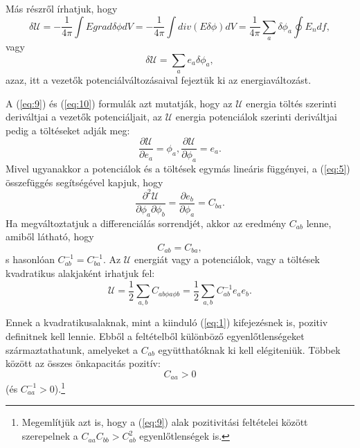 \documentclass{article}
\begin{document}
Más részről írhatjuk, hogy
\begin{equation} \label{eq:10}
    \delta \mathcal{U} = -\frac{1}{4 \pi} \int Egrad \delta \phi dV=-\frac{1}{4 \pi} \int div(E \delta \phi)dV= \frac{1}{4 \pi} \sum\limits_a \delta \phi_a \oint E_n df,
\end{equation}
vagy
\begin{equation} \label{eq:11}
    \delta \mathcal{U} = \sum\limits_a e_a \delta \phi_a ,
\end{equation}
azaz, itt a vezetők potenciálváltozásaival fejeztük ki az energiaváltozást.

A (\ref{eq:9}) és (\ref{eq:10}) formulák azt mutatják, hogy az $\mathcal{U}$ energia töltés szerinti deriváltjai a vezetők potenciáljait, az $\mathcal{U}$ energia potenciálok szerinti deriváltjai pedig a töltéseket adják meg:
\begin{equation} \label{eq:12}
    \frac{\partial \mathcal{U}}{\partial e_a} = \phi_a , \frac{\partial \mathcal{U}}{\partial \phi_a} = e_a .
\end{equation}
Mivel ugyanakkor a potenciálok és a töltések egymás lineáris függényei, a (\ref{eq:5}) összefüggés segítségével kapjuk, hogy
\begin{equation} \label{eq:13}
    \frac{\partial^2 \mathcal{U}}{\partial \phi_a \partial \phi_b} = \frac{\partial e_b}{\partial \phi_a} = C_{ba}.
\end{equation}
Ha megváltoztatjuk a differenciálás sorrendjét, akkor az eredmény $C_{ab}$ lenne, amiből látható, hogy
\begin{equation} \label{eq:14}
    C_{ab} = C_{ba},
\end{equation}
s hasonlóan $C^{-1}_{ab}=C^{-1}_{ba}$. Az $\mathcal{U}$ energiát vagy a potenciálok, vagy a töltések kvadratikus alakjaként irhatjuk fel:
\begin{equation} \label{eq:15}
    \mathcal{U} = \frac{1}{2} \sum\limits_{a, b} C_{ab \phi a \phi b} = \frac{1}{2} \sum\limits_{a, b} C^{-1}_{ab} e_a e_b .
\end{equation}

Ennek a kvadratikusalaknak, mint a kiinduló (\ref{eq:1}) kifejezésnek is, pozitiv definitnek kell lennie. Ebből a feltételből különböző egyenlőtlenségeket származtathatunk, amelyeket a $C_{ab}$ együtthatóknak ki kell elégiteniük. Többek között az összes önkapacitás pozitív:
\begin{equation} \label{eq:16}
    C_{aa} > 0
\end{equation}
(és $C^{-1}_{aa} > 0$).\footnote[5]{Megemlítjük azt is, hogy a (\ref{eq:9}) alak pozitivitási feltételei között szerepelnek a $C_{aa}C_{bb} > C^2_{ab}$
egyenlőtlenségek is.}
\end{document}
